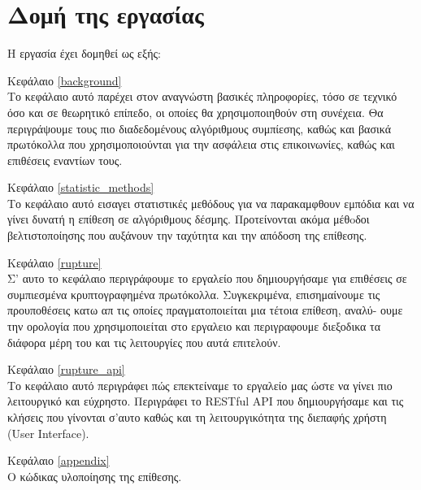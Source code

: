 \section{Δομή της εργασίας}\label{sec:structure}

Η εργασία έχει δομηθεί ως εξής:

 
\begin{description} \item{Κεφάλαιο \ref{background}} \hfill \\

Το κεφάλαιο αυτό παρέχει στον αναγνώστη βασικές πληροφορίες, τόσο σε τεχνικό όσο
και σε θεωρητικό επίπεδο, οι οποίες θα χρησιμοποιηθούν στη συνέχεια.
Θα περιγράψουμε τους πιο διαδεδομένους αλγόριθμους συμπίεσης, καθώς και βασικά
πρωτόκολλα που χρησιμοποιούνται για την ασφάλεια στις επικοινωνίες, καθώς και
επιθέσεις εναντίων τους.\hfill \\

\item{Κεφάλαιο \ref{statistic_methods}} \hfill \\
 
Το κεφάλαιο αυτό εισαγει στατιστικές μεθόδους για να παρακαμφθουν εμπόδια
και να γίνει δυνατή η επίθεση σε αλγόριθμους δέσμης. Προτείνονται ακόμα μέθoδοι
βελτιστοποίησης που αυξάνουν την ταχύτητα και την απόδοση της επίθεσης.


\item{Κεφάλαιο \ref{rupture}} \hfill \\

Σ' αυτο το κεφάλαιο περιγράφουμε το εργαλείο που δημιουργήσαμε για επιθέσεις
σε συμπιεσμένα κρυπτογραφημένα πρωτόκολλα. Συγκεκριμένα, επισημαίνουμε τις
προυποθέσεις κατω απ τις οποίες πραγματοποιείται μια τέτοια επίθεση, αναλύ- ουμε
την ορολογία που χρησιμοποιείται στο εργαλειο και περιγραφουμε διεξοδικα τα
διάφορα μέρη του και τις λειτουργίες που αυτά επιτελούν.


\item{Κεφάλαιο \ref{rupture_api}} \hfill \\

Το κεφάλαιο αυτό περιγράφει πώς επεκτείναμε το εργαλείο μας ώστε να γίνει πιο
λειτουργικό και εύχρηστο. Περιγράφει το RESTful API που δημιουργήσαμε και τις
κλήσεις που γίνονται σ'αυτο καθώς και τη λειτουργικότητα της διεπαφής χρήστη
(User Interface).


\item{Κεφάλαιο \ref{appendix}} \hfill \\

Ο κώδικας υλοποίησης της επίθεσης.  

\end{description}

